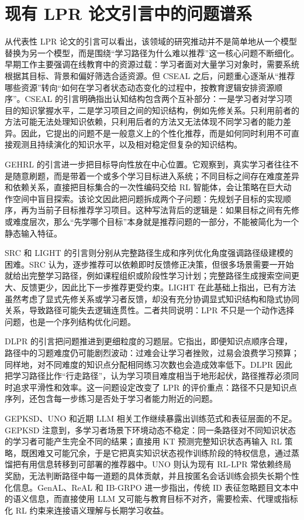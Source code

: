 \documentclass[UTF8,a4paper,zihao=-4]{ctexart}
\begin{document}
\section{现有 LPR 论文引言中的问题谱系}

从代表性 LPR 论文的引言可以看出，该领域的研究推动并不是简单地从一个模型替换为另一个模型，而是围绕“学习路径为什么难以推荐”这一核心问题不断细化。早期工作主要强调在线教育中的资源过载：学习者面对大量学习对象时，需要系统根据其目标、背景和偏好筛选合适资源。但 CSEAL 之后，问题重心逐渐从“推荐哪些资源”转向“如何在学习者状态动态变化的过程中，按教育逻辑安排资源顺序”。CSEAL 的引言明确指出认知结构包含两个互补部分：一是学习者对学习项目的知识掌握水平，二是学习项目之间的知识结构，例如先修关系。只利用前者的方法可能无法处理知识依赖，只利用后者的方法又无法体现不同学习者的能力差异。因此，它提出的问题不是一般意义上的个性化推荐，而是如何同时利用不可直接观测且持续演化的知识水平，以及相对稳定但复杂的知识结构\cite{Liu2019CSEAL}。

GEHRL 的引言进一步把目标导向性放在中心位置。它观察到，真实学习者往往不是随意刷题，而是带着一个或多个学习目标进入系统；不同目标之间存在难度差异和依赖关系，直接把目标集合的一次性编码交给 RL 智能体，会让策略在巨大动作空间中盲目探索。该论文因此把问题拆成两个子问题：先规划子目标的实现顺序，再为当前子目标推荐学习项目\cite{Li2023GEHRL}。这种写法背后的逻辑是：如果目标之间有先修或难度层次，那么“先学哪个目标”本身就是推荐问题的一部分，不能被简化为一个静态输入特征。

SRC 和 LIGHT 的引言则分别从完整路径生成和序列优化角度强调路径级建模的困难。SRC 认为，逐步推荐可以依赖即时反馈修正决策，但很多场景需要一开始就给出完整学习路径，例如课程组织或阶段性学习计划；完整路径生成搜索空间更大、反馈更少，因此比下一步推荐更受约束\cite{Chen2023SRC}。LIGHT 在此基础上指出，已有方法虽然考虑了显式先修关系或学习者反馈，却没有充分协调显式知识结构和隐式协同关系，导致路径可能失去逻辑连贯性\cite{Yu2025LIGHT}。二者共同说明：LPR 不只是一个动作选择问题，也是一个序列结构优化问题。

DLPR 的引言把问题推进到更细粒度的习题层。它指出，即便知识点顺序合理，路径中的习题难度仍可能剧烈波动：过难会让学习者挫败，过易会浪费学习预算；同样地，对不同难度的知识点分配相同练习次数也会造成效率低下。DLPR 因此把学习路径比作“行走路径”，认为学习项目难度相当于地形起伏，路径推荐必须同时追求平滑性和效率\cite{Zhang2024DLPR}。这一问题设定改变了 LPR 的评价重点：路径不只是知识点序列，还包含每一步练习是否处于学习者能力附近的问题。

GEPKSD、UNO 和近期 LLM 相关工作继续暴露出训练范式和表征层面的不足。GEPKSD 注意到，多学习者场景下环境动态不稳定：同一条路径对不同知识状态的学习者可能产生完全不同的结果；直接用 KT 预测完整知识状态再输入 RL 策略，既困难又可能冗余，于是它把真实知识状态视作训练阶段的特权信息，通过蒸馏把有用信息转移到可部署的推荐器中\cite{Li2024GEPKSD}。UNO 则认为现有 RL-LPR 常依赖终局奖励，无法判断路径中每一道题的具体贡献，并且按匿名会话训练会损失长期个性化信息\cite{Peng2026UNO}。GenAL、ReAL 和 IB-GRPO 进一步指出，传统 ID 表征忽略题目文本中的语义信息，而直接使用 LLM 又可能与教育目标不对齐，需要检索、代理或指标化 RL 约束来连接语义理解与长期学习收益\cite{Lv2025GenAL,Lv2025ReAL,Wang2026IBGRPO}。
\end{document}
